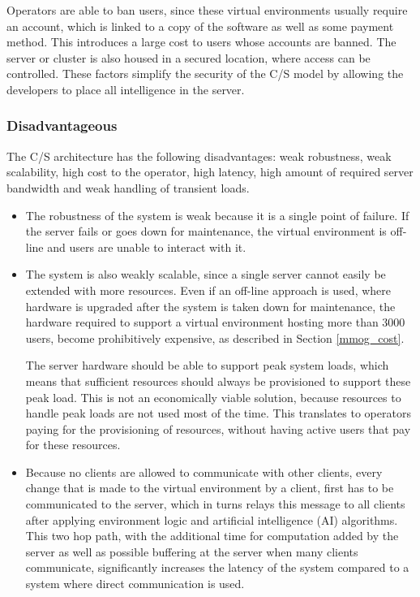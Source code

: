 Operators are able to ban users, since these virtual environments usually require an account, which is linked to a copy of the software as well as some payment method. This introduces a large cost to users whose accounts are banned. The server or cluster is also housed in a secured location, where access can be controlled. These factors simplify the security of the C/S model by allowing the developers to place all intelligence in the server.

\subsubsection{Disadvantageous}
\label{classic_cs_disadvantages}

The C/S architecture has the following disadvantages: weak robustness, weak scalability, high cost to the operator, high latency, high amount of required server bandwidth and weak handling of transient loads.
\begin{itemize}
\item The robustness of the system is weak because it is a single point of failure. If the server fails or goes down for maintenance, the virtual environment is off-line and users are unable to interact with it.

\item The system is also weakly scalable, since a single server cannot easily be extended with more resources. Even if an off-line approach is used, where hardware is upgraded after the system is taken down for maintenance, the hardware required to support a virtual environment hosting more than 3000 users, become prohibitively expensive, as described in Section \ref{mmog_cost}.

The server hardware should be able to support peak system loads, which means that sufficient resources should always be provisioned to support these peak load. This is not an economically viable solution, because resources to handle peak loads are not used most of the time. This translates to operators paying for the provisioning of resources, without having active users that pay for these resources.

\item Because no clients are allowed to communicate with other clients, every change that is made to the virtual environment by a client, first has to be communicated to the server, which in turns relays this message to all clients after applying environment logic and artificial intelligence (AI) algorithms. This two hop path, with the additional time for computation added by the server as well as possible buffering at the server when many clients communicate, significantly increases the latency of the system compared to a system where direct communication is used.
\end{itemize}

